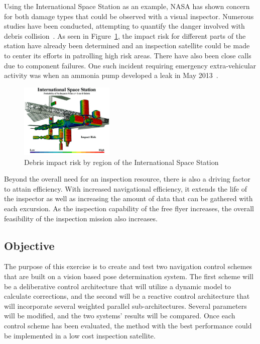 \documentclass[journal, 10pt]{IEEEtran}
\begin{document}
Using the International Space Station as an example, NASA has shown concern for both damage types that could be observed with a visual inspector.  Numerous studies have been conducted, attempting to quantify the danger involved with debris collision~\cite{Risk}.  As seen in Figure~\ref{ISS_risk}, the impact risk for different parts of the station have already been determined and an inspection satellite could be made to center its efforts in patrolling high risk areas.  There have also been close calls due to component failures.  One such incident requiring emergency extra-vehicular activity was when an ammonia pump developed a leak in May 2013~\cite{Ammonia}.

\begin{figure}[tb]
\begin{center}
\includegraphics[width=0.4\textwidth]{figures/ISS_impact_risk}
\caption{Debris impact risk by region of the International Space Station}
\label{ISS_risk}
\end{center}
\end{figure}

Beyond the overall need for an inspection resource, there is also a driving factor to attain efficiency.  With increased navigational efficiency, it extends the life of the inspector as well as increasing the amount of data that can be gathered with each excursion.  As the inspection capability of the free flyer increases, the overall feasibility of the inspection mission also increases.


\subsection{Objective}
The purpose of this exercise is to create and test two navigation control schemes that are built on a vision based pose determination system.  The first scheme will be a deliberative control architecture that will utilize a dynamic model to calculate corrections, and the second will be a reactive control architecture that will incorporate several weighted parallel sub-architectures. Several parameters will be modified, and the two systems' results will be compared. Once each control scheme has been evaluated, the method with the best performance could be implemented in a low cost inspection satellite. 
\end{document}
